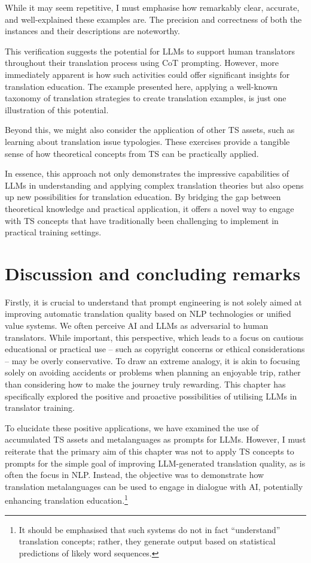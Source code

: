 \documentclass[output=paper,colorlinks,citecolor=brown, japanesefont]{langscibook}
\begin{document}
While it may seem repetitive, I must emphasise how remarkably clear, accurate, and well-explained these examples are. The precision and correctness of both the instances and their descriptions are noteworthy.

This verification suggests the potential for LLMs to support human translators throughout their translation process using CoT prompting. However, more immediately apparent is how such activities could offer significant insights for translation education. The example presented here, applying a well-known taxonomy of translation strategies to create translation examples, is just one illustration of this potential.

Beyond this, we might also consider the application of other TS assets, such as learning about translation issue typologies. These exercises provide a tangible sense of how theoretical concepts from TS can be practically applied.

In essence, this approach not only demonstrates the impressive capabilities of LLMs in understanding and applying complex translation theories but also opens up new possibilities for translation education. By bridging the gap between theoretical knowledge and practical application, it offers a novel way to engage with TS concepts that have traditionally been challenging to implement in practical training settings.

\section{Discussion and concluding remarks}

Firstly, it is crucial to understand that prompt engineering is not solely aimed at improving automatic translation quality based on NLP technologies or unified value systems. We often perceive AI and LLMs as adversarial to human translators. While important, this perspective, which leads to a focus on cautious educational or practical use -- such as copyright concerns or ethical considerations -- may be overly conservative. To draw an extreme analogy, it is akin to focusing solely on avoiding accidents or problems when planning an enjoyable trip, rather than considering how to make the journey truly rewarding. This chapter has specifically explored the positive and proactive possibilities of utilising LLMs in translator training.

To elucidate these positive applications, we have examined the use of accumulated TS assets and metalanguages as prompts for LLMs. However, I must reiterate that the primary aim of this chapter was not to apply TS concepts to prompts for the simple goal of improving LLM-generated translation quality, as is often the focus in NLP. Instead, the objective was to demonstrate how translation metalanguages can be used to engage in dialogue with AI, potentially enhancing translation education.\footnote{It should be emphasised that such systems do not in fact “understand” translation concepts; rather, they generate output based on statistical predictions of likely word sequences.}
\end{document}
